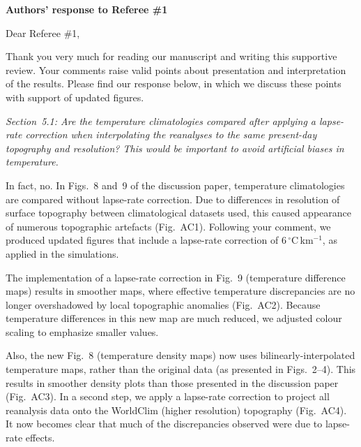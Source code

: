 \documentclass[10pt]{article}
\begin{document}
\textbf{Authors' response to Referee {\#}1}
\bigskip


\renewcommand\thefigure{AC\arabic{figure}}
\def\referee#1{\bigskip\textcolor{journalname}{\textit{#1}}}
\def\msquote#1{\begin{quote}\textit{#1}\end{quote}}

Dear Referee {\#}1,

Thank you very much for reading our manuscript and writing this supportive review. Your comments raise valid points about presentation and interpretation of the results. Please find our response below, in which we discuss these points with support of updated figures.

\referee{Section~5.1: Are the temperature climatologies compared after applying a lapse-rate correction when interpolating the reanalyses to the same present-day topography and resolution? This would be important to avoid artificial biases in temperature.}

In fact, no. In Figs.~8 and~9 of the discussion paper, temperature climatologies are compared without lapse-rate correction. Due to differences in resolution of surface topography between climatological datasets used, this caused appearance of numerous topographic artefacts (Fig.~AC1). Following your comment, we produced updated figures that include a lapse-rate correction of 6\,{$^\circ$}C\,km$^{-1}$, as applied in the simulations.

The implementation of a lapse-rate correction in Fig.~9 (temperature difference maps) results in smoother maps, where effective temperature discrepancies are no longer overshadowed by local topographic anomalies (Fig.~AC2). Because temperature differences in this new map are much reduced, we adjusted colour scaling to emphasize smaller values.

Also, the new Fig.~8 (temperature density maps) now uses bilinearly-interpolated temperature maps, rather than the original data (as presented in Figs.~2--4). This results in smoother density plots than those presented in the discussion paper (Fig.~AC3). In a second step, we apply a lapse-rate correction to project all reanalysis data onto the WorldClim (higher resolution) topography (Fig.~AC4). It now becomes clear that much of the discrepancies observed were due to lapse-rate effects.
\end{document}
